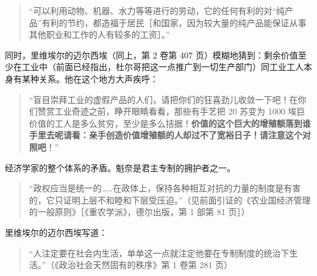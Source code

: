 \begin{quote}“可以利用动物、机器、水力等等进行的劳动，它的任何有利的\fontbox{~\{}对“纯产品”有利的\fontbox{\}~}节约，都造福于居民［和国家，因为较大量的纯产品能保证从事其他职业和工作的人有较多的工资］。”\end{quote}

同时，里维埃尔的迈尔西埃（同上，第 2 卷第 407 页）模糊地猜到：剩余价值至少在工业中（前面已经指出，杜尔哥把这一点推广到一切生产部门）同工业工人本身有某种关系。他在这个地方大声疾呼：

\begin{quote}“盲目崇拜工业的虚假产品的人们，请把你们的狂喜劲儿收敛一下吧！在你们赞赏工业奇迹之前，睁开眼睛看看，那些有手艺把 20 苏变为 1000 埃巨价值的工人是多么贫穷，至少是多么拮据！\textbf{价值的这个巨大的增殖额落到谁手里去呢请看：亲手创造价值增殖额的人却过不了宽裕日子！请注意这个对照吧}！”\end{quote}


经济学家的整个体系的矛盾。魁奈是君主专制的拥护者之一。

\begin{quote}“政权应当是统一的……在政体上，保持各种相互对抗的力量的制度是有害的，它只证明上层不和睦和下层受压迫。”（见前面引证的《农业国经济管理的一般原则》［《重农学派》，德尔出版，第 1 部第 81 页］）\end{quote}

里维埃尔的迈尔西埃写道：

\begin{quote}“人注定要在社会内生活，单单这一点就注定他要在专制制度的统治下生活。”（《政治社会天然固有的秩序》第 1 卷第 281 页）\end{quote}

